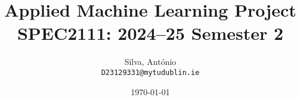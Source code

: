 \title{Applied Machine Learning Project\\[0.2cm] SPEC2111: 2024--25 Semester 2}
\author{Silva, António\\
  \texttt{D23129331@mytudublin.ie}
}
\date{\today}
